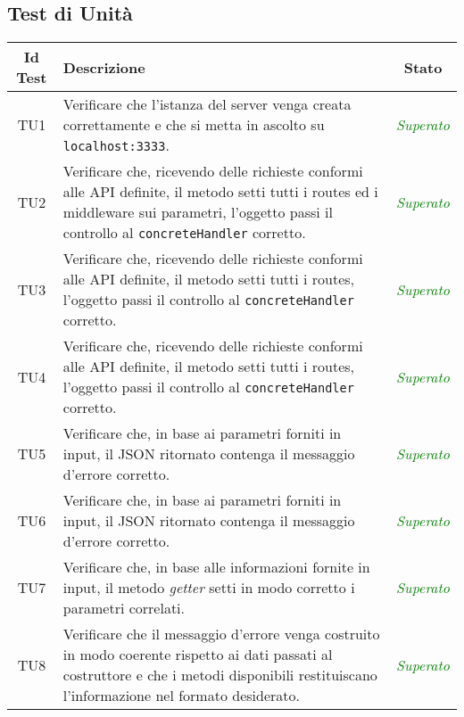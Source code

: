 \subsection{Test di Unità}

\normalsize
\begin{longtable}{|c|>{}m{8cm}|c|}
\hline 
\textbf{Id Test} & \textbf{Descrizione} & \textbf{Stato}\\
\hline
\endhead
\hypertarget{TU1}{TU1} & Verificare che l'istanza del server venga creata correttamente e che si metta in ascolto su \texttt{localhost:3333}\finaleTestUnita{}. & \textcolor{Green}{\textit{Superato}}\\ \hline
\hypertarget{TU2}{TU2} & Verificare che, ricevendo delle richieste conformi alle API definite, il metodo setti tutti i routes ed i middleware sui parametri, l'oggetto passi il controllo al \texttt{concreteHandler} corretto\finaleTestUnita{}. & \textcolor{Green}{\textit{Superato}}\\ \hline
\hypertarget{TU3}{TU3} & Verificare che, ricevendo delle richieste conformi alle API definite, il metodo setti tutti i routes, l'oggetto passi il controllo al \texttt{concreteHandler} corretto\finaleTestUnita{}. & \textcolor{Green}{\textit{Superato}}\\ \hline
\hypertarget{TU4}{TU4} & Verificare che, ricevendo delle richieste conformi alle API definite, il metodo setti tutti i routes, l'oggetto passi il controllo al \texttt{concreteHandler} corretto\finaleTestUnita{}. & \textcolor{Green}{\textit{Superato}}\\ \hline
\hypertarget{TU5}{TU5} & Verificare che, in base ai parametri forniti in input, il JSON ritornato contenga il messaggio d’errore corretto\finaleTestUnita{}. & \textcolor{Green}{\textit{Superato}}\\ \hline
\hypertarget{TU6}{TU6} & Verificare che, in base ai parametri forniti in input, il JSON ritornato contenga il messaggio d'errore corretto\finaleTestUnita{}. & \textcolor{Green}{\textit{Superato}}\\ \hline
\hypertarget{TU7}{TU7} & Verificare che, in base alle informazioni fornite in input, il metodo \textit{getter} setti in modo corretto i parametri correlati\finaleTestUnita{}. & \textcolor{Green}{\textit{Superato}}\\ \hline
\hypertarget{TU8}{TU8} & Verificare che il messaggio d'errore venga costruito in modo coerente rispetto ai dati passati al costruttore e che i metodi disponibili restituiscano l'informazione nel formato desiderato\finaleTestUnita{}. & \textcolor{Green}{\textit{Superato}}\\ \hline

\end{longtable}
